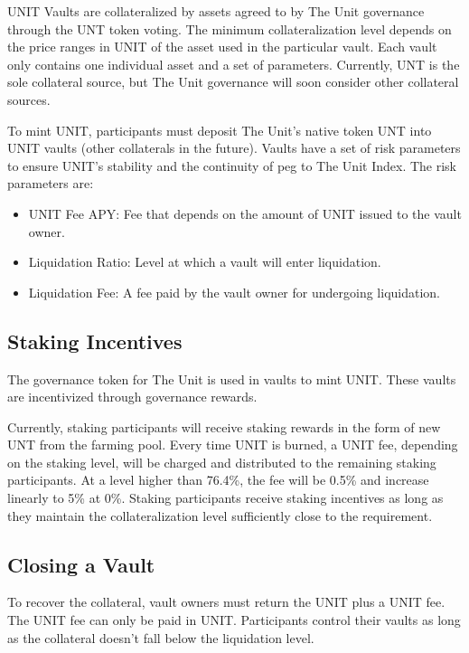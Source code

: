 \documentclass[12pt]{article}
\begin{document}
UNIT Vaults are collateralized by assets agreed to by The Unit governance through the UNT token voting. The minimum collateralization level depends on the price ranges in UNIT of the asset used in the particular vault. Each vault only contains one individual asset and a set of parameters. Currently, UNT is the sole collateral source, but The Unit governance will soon consider other collateral sources.

To mint UNIT, participants must deposit The Unit’s native token UNT into UNIT vaults (other collaterals in the future). Vaults have a set of risk parameters to ensure UNIT's stability and the continuity of peg to The Unit Index. The risk parameters are:

\begin{itemize}
\item UNIT Fee APY: Fee that depends on the amount of UNIT issued to the vault owner.
\item Liquidation Ratio: Level at which a vault will enter liquidation.
\item Liquidation Fee: A fee paid by the vault owner for undergoing liquidation.
\end{itemize}


\subsection{Staking Incentives}

The governance token for The Unit is used in vaults to mint UNIT. These vaults are incentivized through governance rewards.

Currently, staking participants will receive staking rewards in the form of new UNT from the farming pool. Every time UNIT is burned, a UNIT fee, depending on the staking level, will be charged and distributed to the remaining staking participants. At a level higher than 76.4\%, the fee will be 0.5\% and increase linearly to 5\% at 0\%. Staking participants receive staking incentives as long as they maintain the collateralization level sufficiently close to the requirement.


\subsection{Closing a Vault}

To recover the collateral, vault owners must return the UNIT plus a UNIT fee. The UNIT  fee can only be paid in UNIT. Participants control their vaults as long as the collateral doesn’t fall below the liquidation level. 
\end{document}
